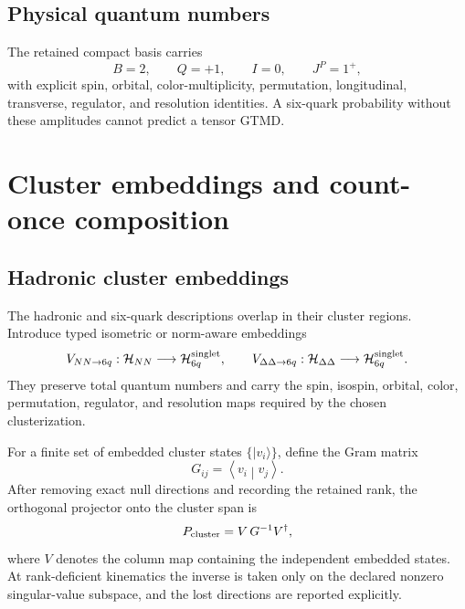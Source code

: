\documentclass[11pt]{article}
\newcommand{\Hil}{\mathcal H}
\newcommand{\inner}[2]{\left\langle #1\middle|#2\right\rangle}
\begin{document}
\subsection{Physical quantum numbers}

The retained compact basis carries
\begin{equation}
 B=2,
 \qquad Q=+1,
 \qquad I=0,
 \qquad J^P=1^+,
\label{eq:sixq-quantum-numbers}
\end{equation}
with explicit spin, orbital, color-multiplicity, permutation, longitudinal, transverse, regulator, and resolution identities.  A six-quark probability without these amplitudes cannot predict a tensor GTMD.

\section{Cluster embeddings and count-once composition}
\label{sec:cluster-matching}

\subsection{Hadronic cluster embeddings}

The hadronic and six-quark descriptions overlap in their cluster regions.  Introduce typed isometric or norm-aware embeddings
\begin{equation}
 V_{NN\to6q}:\Hil_{NN}\longrightarrow\Hil_{6q}^{\rm singlet},
 \qquad
 V_{\Delta\Delta\to6q}:\Hil_{\Delta\Delta}\longrightarrow\Hil_{6q}^{\rm singlet}.
\label{eq:cluster-embeddings}
\end{equation}
They preserve total quantum numbers and carry the spin, isospin, orbital, color, permutation, regulator, and resolution maps required by the chosen clusterization.

For a finite set of embedded cluster states \(\{|v_i\rangle\}\), define the Gram matrix
\begin{equation}
 G_{ij}=\inner{v_i}{v_j}.
\label{eq:cluster-gram}
\end{equation}
After removing exact null directions and recording the retained rank, the orthogonal projector onto the cluster span is
\begin{equation}
 P_{\rm cluster}
 =V\,G^{-1}V^\dagger,
\label{eq:cluster-projector}
\end{equation}
where \(V\) denotes the column map containing the independent embedded states.  At rank-deficient kinematics the inverse is taken only on the declared nonzero singular-value subspace, and the lost directions are reported explicitly.
\end{document}
